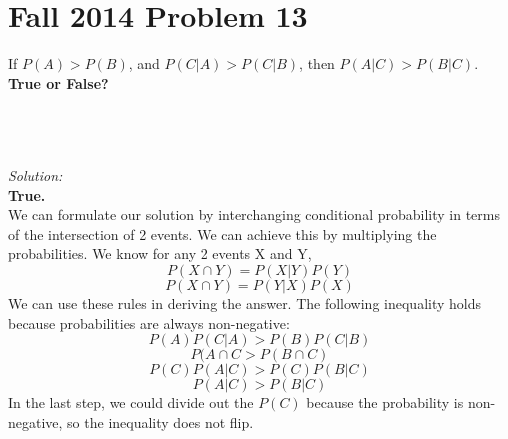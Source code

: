 \documentclass{article}
\begin{document}
\section{Fall 2014 Problem 13}
\begin{question}
If \(P(A) > P(B) \), and \(P(C|A)>P(C|B)\), then \(P(A|C)>P(B|C)\). \textbf{True or False?}
\\\\
\begin{solution}
\\\\\textit{Solution:}
\\\textbf{True.}
\\We can formulate our solution by interchanging conditional probability in terms of the intersection of 2 events. We can achieve this by multiplying the probabilities. 
We know for any 2 events X and Y, 
\[P(X \cap Y) = P(X|Y)P(Y) \]
\[P(X \cap Y) = P(Y|X)P(X) \]
We can use these rules in deriving the answer. The following inequality holds because probabilities are always non-negative:
\[P(A)P(C|A)>P(B)P(C|B)\]
\[P(A\cap C>P(B \cap C)\]
\[P(C)P(A|C)>P(C)P(B|C)\]
\[P(A|C)>P(B|C)\]
In the last step, we could divide out the \(P(C)\) because the probability is non-negative, so the inequality does not flip.






\end{solution}


\end{question}
\end{document}
